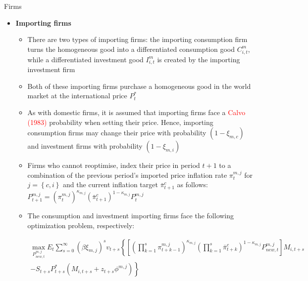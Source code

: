 \documentclass[9pt]{beamer}
\let\olditem\item
\renewcommand{\item}{%
\olditem\vspace{\fill}}
\begin{document}
\begin{frame}{Firms}
\begin{itemize}
    \item \textbf{Importing firms} 
    \begin{itemize}
        \item There are two types of importing firms:  the importing consumption firm turns the homogeneous good into a differentiated consumption good $C_{i,t}^{m}$, while a differentiated investment good $I_{i,t}^{m}$ is created by the importing investment firm
        
        \item Both of these importing firms purchase a homogeneous good in the world market at the international price $P_t^{*}$

        \item As with domestic firms, it is assumed that importing firms face a \textcolor{red}{Calvo (1983)} probability when setting their price. Hence, importing consumption firms may change their price with probability $\left(1 - \xi_{m,c}\right)$ and investment firms with probability $\left(1 - \xi_{m,i}\right)$
        
        \item Firms who cannot reoptimise, index their price in period $t + 1$ to a combination of the previous period’s imported price inflation rate $\pi_t^{m,j}$ for  $j = \left\{c,i \right\}$ and the current inflation target $\bar{\pi}_{t+1}^{c}$ as follows: $P_{t+1}^{m, j}=\left(\pi_{t}^{m, j}\right)^{\kappa_{m, j}}\left(\bar{\pi}_{t+1}^{c}\right)^{1-\kappa_{m, j}} P_{t}^{m, j}$
        
        \item The consumption and investment importing firms face the following optimization problem, respectively:
        
$$\begin{array}{c}
    \max _{P_{new,t}^{m,j}} E_{t} \sum_{s=0}^{\infty}\left(\beta \xi_{m, j}\right)^{s} v_{t+s}\left\{\left[\left(\prod_{k=1}^{s} \pi_{t+k-1}^{m, j}\right)^{\kappa_{m, j}}\left(\prod_{k=1}^{s} \bar{\pi}_{t+k}^{c}\right)^{1-\kappa_{m, j}} P_{new,t}^{m, j}\right] M_{i, t+s}\right. \\
    \left.-S_{t+s} P_{t+s}^{*}\left(M_{i, t+s}+z_{t+s} \phi^{m, j}\right)\right\}
    \end{array}
$$
    

    
\end{itemize}
\end{itemize}

\end{frame}
\end{document}
